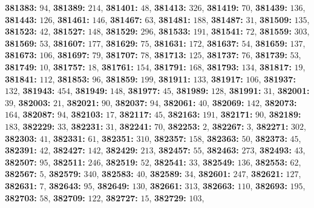 \textsf{\bfseries 381383:} $94$, \textsf{\bfseries 381389:} $214$, \textsf{\bfseries 381401:} $48$, \textsf{\bfseries 381413:} $326$, \textsf{\bfseries 381419:} $70$, \textsf{\bfseries 381439:} $136$, \textsf{\bfseries 381443:} $126$, \textsf{\bfseries 381461:} $146$, \textsf{\bfseries 381467:} $63$, \textsf{\bfseries 381481:} $188$, \textsf{\bfseries 381487:} $31$, \textsf{\bfseries 381509:} $135$, \textsf{\bfseries 381523:} $42$, \textsf{\bfseries 381527:} $148$, \textsf{\bfseries 381529:} $296$, \textsf{\bfseries 381533:} $191$, \textsf{\bfseries 381541:} $72$, \textsf{\bfseries 381559:} $303$, \textsf{\bfseries 381569:} $53$, \textsf{\bfseries 381607:} $177$, \textsf{\bfseries 381629:} $75$, \textsf{\bfseries 381631:} $172$, \textsf{\bfseries 381637:} $54$, \textsf{\bfseries 381659:} $137$, \textsf{\bfseries 381673:} $106$, \textsf{\bfseries 381697:} $79$, \textsf{\bfseries 381707:} $78$, \textsf{\bfseries 381713:} $125$, \textsf{\bfseries 381737:} $76$, \textsf{\bfseries 381739:} $53$, \textsf{\bfseries 381749:} $10$, \textsf{\bfseries 381757:} $18$, \textsf{\bfseries 381761:} $154$, \textsf{\bfseries 381791:} $168$, \textsf{\bfseries 381793:} $134$, \textsf{\bfseries 381817:} $19$, \textsf{\bfseries 381841:} $112$, \textsf{\bfseries 381853:} $96$, \textsf{\bfseries 381859:} $199$, \textsf{\bfseries 381911:} $133$, \textsf{\bfseries 381917:} $106$, \textsf{\bfseries 381937:} $132$, \textsf{\bfseries 381943:} $454$, \textsf{\bfseries 381949:} $148$, \textsf{\bfseries 381977:} $45$, \textsf{\bfseries 381989:} $128$, \textsf{\bfseries 381991:} $31$, \textsf{\bfseries 382001:} $39$, \textsf{\bfseries 382003:} $21$, \textsf{\bfseries 382021:} $90$, \textsf{\bfseries 382037:} $94$, \textsf{\bfseries 382061:} $40$, \textsf{\bfseries 382069:} $142$, \textsf{\bfseries 382073:} $164$, \textsf{\bfseries 382087:} $94$, \textsf{\bfseries 382103:} $17$, \textsf{\bfseries 382117:} $45$, \textsf{\bfseries 382163:} $191$, \textsf{\bfseries 382171:} $90$, \textsf{\bfseries 382189:} $183$, \textsf{\bfseries 382229:} $33$, \textsf{\bfseries 382231:} $31$, \textsf{\bfseries 382241:} $70$, \textsf{\bfseries 382253:} $2$, \textsf{\bfseries 382267:} $3$, \textsf{\bfseries 382271:} $302$, \textsf{\bfseries 382303:} $41$, \textsf{\bfseries 382331:} $61$, \textsf{\bfseries 382351:} $310$, \textsf{\bfseries 382357:} $158$, \textsf{\bfseries 382363:} $50$, \textsf{\bfseries 382373:} $45$, \textsf{\bfseries 382391:} $42$, \textsf{\bfseries 382427:} $142$, \textsf{\bfseries 382429:} $213$, \textsf{\bfseries 382457:} $55$, \textsf{\bfseries 382463:} $273$, \textsf{\bfseries 382493:} $43$, \textsf{\bfseries 382507:} $95$, \textsf{\bfseries 382511:} $246$, \textsf{\bfseries 382519:} $52$, \textsf{\bfseries 382541:} $33$, \textsf{\bfseries 382549:} $136$, \textsf{\bfseries 382553:} $62$, \textsf{\bfseries 382567:} $5$, \textsf{\bfseries 382579:} $340$, \textsf{\bfseries 382583:} $40$, \textsf{\bfseries 382589:} $34$, \textsf{\bfseries 382601:} $247$, \textsf{\bfseries 382621:} $127$, \textsf{\bfseries 382631:} $7$, \textsf{\bfseries 382643:} $95$, \textsf{\bfseries 382649:} $130$, \textsf{\bfseries 382661:} $313$, \textsf{\bfseries 382663:} $110$, \textsf{\bfseries 382693:} $195$, \textsf{\bfseries 382703:} $58$, \textsf{\bfseries 382709:} $122$, \textsf{\bfseries 382727:} $15$, \textsf{\bfseries 382729:} $103$, 
